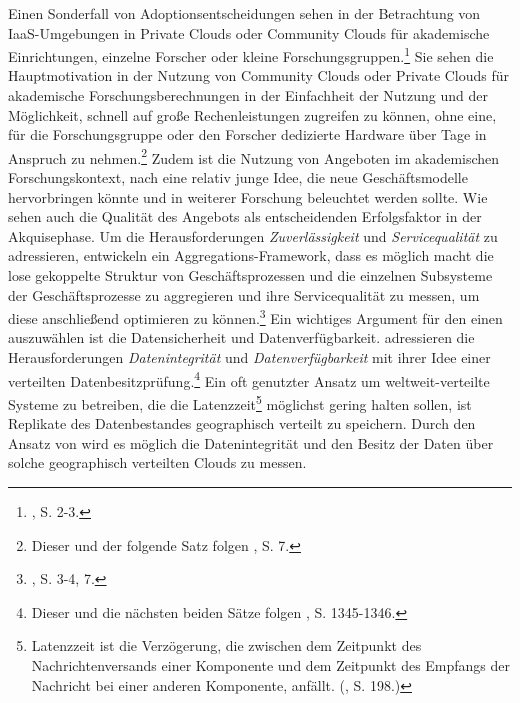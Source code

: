 Einen Sonderfall von \CC  Adoptionsentscheidungen sehen \cite{Bernius.2012} in der Betrachtung von \acs{IaaS}-Umgebungen in Private Clouds oder Community Clouds für akademische Einrichtungen, einzelne Forscher oder kleine Forschungsgruppen.\footnote{\cite{Bernius.2012}, S. 2-3.}\saveFN{\Bernius} 
Sie sehen die Hauptmotivation in der Nutzung von Community Clouds oder Private Clouds für akademische Forschungsberechnungen in der Einfachheit der Nutzung und der Möglichkeit, schnell auf große Rechenleistungen zugreifen zu können, ohne eine, für die Forschungsgruppe oder den Forscher dedizierte Hardware über Tage in Anspruch zu nehmen.\footnote{Dieser und der folgende Satz folgen \cite{Bernius.2012}, S. 7.} 
Zudem ist die Nutzung von \CC Angeboten im akademischen Forschungskontext, nach \cite{Bernius.2012} eine relativ junge Idee, die neue Geschäftsmodelle hervorbringen könnte und in weiterer Forschung beleuchtet werden sollte.
\newline
Wie \cite{Giessmann.2012} sehen auch \cite{Knapper.2012} die Qualität des Angebots als entscheidenden Erfolgsfaktor in der Akquisephase. Um die Herausforderungen \emph{Zuverlässigkeit} und \emph{Servicequalität} zu adressieren, entwickeln \cite{Knapper.2012} ein Aggregations-Framework, dass es möglich macht die lose gekoppelte Struktur von Geschäftsprozessen und die einzelnen Subsysteme der Geschäftsprozesse zu aggregieren und ihre Servicequalität zu messen, um diese anschließend optimieren zu können.\footnote{\cite{Knapper.2012}, S. 3-4, 7.}
\newline
Ein wichtiges Argument für den \CSU einen \CSP auszuwählen ist die Datensicherheit und Datenverfügbarkeit. \cite{He.2012} adressieren die Herausforderungen \emph{Datenintegrität} und \emph{Datenverfügbarkeit} mit ihrer Idee einer verteilten Datenbesitzprüfung.\footnote{Dieser und die nächsten beiden Sätze folgen \cite{He.2012}, S. 1345-1346.}
Ein oft genutzter Ansatz um weltweit-verteilte \CC Systeme zu betreiben, die die Latenzzeit\footnote{Latenzzeit ist die Verzögerung, die zwischen dem Zeitpunkt des Nachrichtenversands einer Komponente und dem Zeitpunkt des Empfangs der Nachricht bei einer anderen Komponente, anfällt. (\cite{Sommerville.2012}, S. 198.)}
möglichst gering halten sollen, ist Replikate des Datenbestandes geographisch verteilt zu speichern.
Durch den Ansatz von \cite{He.2012} wird es möglich die Datenintegrität und den Besitz der Daten über solche geographisch verteilten Clouds zu messen.
\newline

